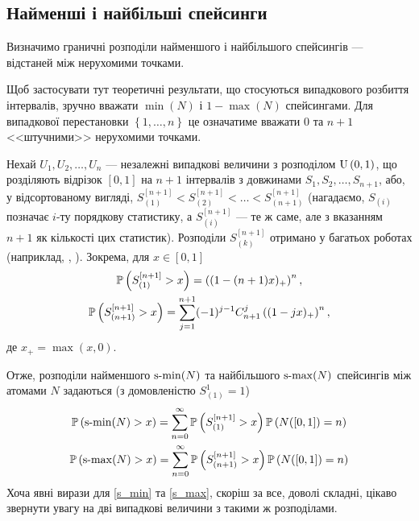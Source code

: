 \subsection{Найменші і найбільші спейсинги}
Визначимо граничні розподіли найменшого і найбільшого спейсингів --- відстаней
між нерухомими точками.
\begin{remark}
    Щоб застосувати тут теоретичні результати, що стосуються
    випадкового розбиття інтервалів, зручно вважати
    $\min(N)$ і $1-\max(N)$ спейсингами. Для випадкової
    перестановки $\left\{1, \dots, n\right\}$ це означатиме
    вважати $0$ та $n+1$ <<штучними>> нерухомими точками.
\end{remark}

Нехай $U_1, U_2, \dots, U_{n}$ ---
незалежні випадкові величини
з розподілом $\mathrm{U}\left(0, 1\right)$, що розділяють відрізок $[0, 1]$ на $n+1$
інтервалів з довжинами $S_1, S_2, \dots, S_{n+1}$, або, у відсортованому вигляді, 
$S_{(1)}^{[n+1]} < S_{(2)}^{[n+1]} < \dots < S_{(n+1)}^{[n+1]}$
(нагадаємо, $S_{(i)}$ позначає $i$-ту порядкову статистику, а
$S_{(i)}^{[n+1]}$ --- те ж саме, але з вказанням $n+1$ як кількості цих статистик).
Розподіли $S_{(k)}^{[n+1]}$ отримано у багатьох роботах
(наприклад, \cite{Holst_1980}, \cite{Pinelis_2019}). Зокрема, для $x\in[0,1]$
\begin{gather}
    \label{min_spacing}
    \P{S_{(1)}^{[n+1]} > x} = \left((1-(n+1)x)_+\right)^n, \\
    \label{max_spacing}
    \P{S_{(n+1)}^{[n+1]} > x} = 
    \sum_{j=1}^{n+1} (-1)^{j-1} C_{n+1}^j \left((1-jx)_+\right)^n,
\end{gather}
де $x_+ = \max(x, 0)$.

Отже, розподіли найменшого $\operatorname{s-min}(N)$ та найбільшого $\operatorname{s-max}(N)$ спейсингів 
між атомами $N$ задаються
(з домовленістю $S_{(1)}^{1} = 1$)
\begin{gather}
    \label{s_min}
    \P{\smin(N) > x} = 
    \sum_{n=0}^{\infty} \P{S_{(1)}^{[n+1]} > x} \P{N([0, 1]) = n} \\
    \label{s_max}
    \P{\smax(N) > x} = 
    \sum_{n=0}^{\infty} \P{S_{(n+1)}^{[n+1]} > x} \P{N([0, 1]) = n}
\end{gather}
Хоча явні вирази для \eqref{s_min} та \eqref{s_max},
скоріш за все, доволі складні, цікаво звернути увагу на дві випадкові величини
з такими ж розподілами.

